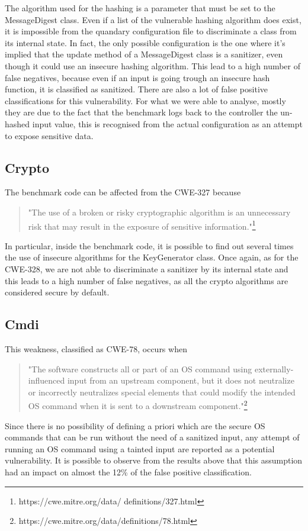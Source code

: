 \documentclass[../Report.tex]{subfiles}
\begin{document}
The algorithm used for the hashing is a parameter that must be set to the MessageDigest class. Even if a list of the vulnerable hashing algorithm does exist, it is impossible from the quandary configuration file to discriminate a class from its internal state. In fact, the only possible configuration is the one where it's implied that the update method of a MessageDigest class is a sanitizer, even though it could use an insecure hashing algorithm. This lead to a high number of false negatives, because even if an input is going trough an insecure hash function, it is classified as sanitized. There are also a lot of false positive classifications for this vulnerability. For what we were able to analyse, mostly they are due to the fact that the benchmark logs back to the controller the un-hashed input value, this is recognised from the actual configuration as an attempt to expose sensitive data.  \\

\subsection{Crypto}

The benchmark code can be affected from the CWE-327 because

\begin{quote}
	"The use of a broken or risky cryptographic algorithm is an unnecessary risk that may 
	result in the exposure of sensitive information."\footnote{https://cwe.mitre.org/data/
	definitions/327.html}
\end{quote}

In particular, inside the benchmark code, it is possible to find out several times the use of insecure algorithms for the KeyGenerator class. Once again, as for the CWE-328, we are not able to discriminate a sanitizer by its internal state and this leads to a high number of false negatives, as all the crypto algorithms are considered secure by default. 

\subsection{Cmdi}

This weakness, classified as CWE-78, occurs when

\begin{quote}
 "The software constructs all or part of an OS command using externally-influenced input from 
 an upstream component, but it does not neutralize or incorrectly neutralizes special elements 
 that could modify the intended OS command when it is sent to a downstream 
 component."\footnote{https://cwe.mitre.org/data/definitions/78.html}	
\end{quote}

Since there is no possibility of defining a priori which are the secure OS commands that can be run without the need of a sanitized input, any attempt of running an OS command using a tainted input are reported as a potential vulnerability. It is possible to observe from the results above that this assumption had an impact on almost the 12\% of the false positive classification.
\end{document}
